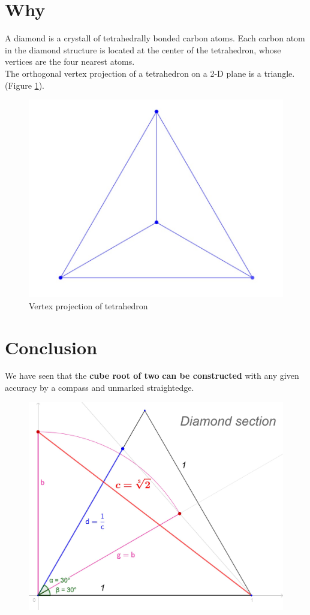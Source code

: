 \documentclass[12pt, letterpaper, oneside]{report}
\begin{document}
\begin{center}

\end{center}
\newpage
 
\section {Why}
A diamond is a crystall of tetrahedrally bonded carbon atoms.
Each carbon atom in the diamond structure is located at the center of the tetrahedron, whose vertices are the four nearest atoms.\cite{B}
\\
The orthogonal vertex projection of a tetrahedron on a 2-D plane is a triangle. (Figure \ref{fig:tetrahedron}).
\begin{figure}[h]
	\centering
	\includegraphics[width=0.3\linewidth]{images/tetrahedron}
	\caption{Vertex projection of tetrahedron}
	\label{fig:tetrahedron}
\end{figure}


\section{Conclusion}
\begin{center}
	We have seen that the \textbf{cube root of two} \textbf{can be constructed} with any given accuracy by a compass and unmarked straightedge.
\end{center}



\begin{figure}[h]
	\centering
	\includegraphics[width=0.6\linewidth]{images/ds_def.jpg}
	
	\label{fig:Diamond Section}
\end{figure}
\end{document}
